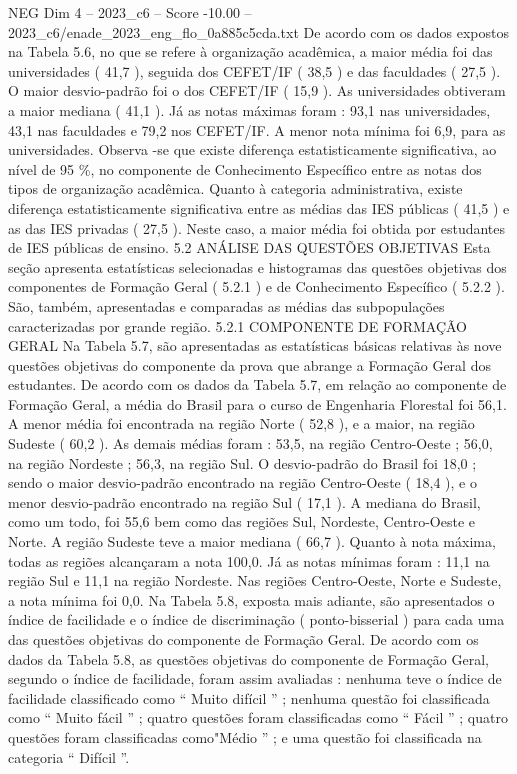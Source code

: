 \begin{textsample}{NEG Dim 4 – 2023\_c6 – Score -10.00 – 2023\_c6/enade\_2023\_eng\_flo\_0a885c5cda.txt}
De acordo com os dados expostos na Tabela 5.6, no que se refere à organização acadêmica, a maior média foi das universidades ( 41,7 ), seguida dos CEFET/IF ( 38,5 ) e das faculdades ( 27,5 ).
O maior desvio-padrão foi o dos CEFET/IF ( 15,9 ).
As universidades obtiveram a maior mediana ( 41,1 ).
Já as notas máximas foram : 93,1 nas universidades, 43,1 nas faculdades e 79,2 nos CEFET/IF.
A menor nota mínima foi 6,9, para as universidades.
Observa -se que existe diferença estatisticamente significativa, ao nível de 95 \%, no componente de Conhecimento Específico entre as notas dos tipos de organização acadêmica.
Quanto à categoria administrativa, existe diferença estatisticamente significativa entre as médias das IES públicas ( 41,5 ) e as das IES privadas ( 27,5 ).
Neste caso, a maior média foi obtida por estudantes de IES públicas de ensino. 5.2 ANÁLISE DAS QUESTÕES OBJETIVAS Esta seção apresenta estatísticas selecionadas e histogramas das questões objetivas dos componentes de Formação Geral ( 5.2.1 ) e de Conhecimento Específico ( 5.2.2 ).
São, também, apresentadas e comparadas as médias das subpopulações caracterizadas por grande região. 5.2.1 COMPONENTE DE FORMAÇÃO GERAL Na Tabela 5.7, são apresentadas as estatísticas básicas relativas às nove questões objetivas do componente da prova que abrange a Formação Geral dos estudantes.
De acordo com os dados da Tabela 5.7, em relação ao componente de Formação Geral, a média do Brasil para o curso de Engenharia Florestal foi 56,1.
A menor média foi encontrada na região Norte ( 52,8 ), e a maior, na região Sudeste ( 60,2 ).
As demais médias foram : 53,5, na região Centro-Oeste ; 56,0, na região Nordeste ; 56,3, na região Sul.
O desvio-padrão do Brasil foi 18,0 ; sendo o maior desvio-padrão encontrado na região Centro-Oeste ( 18,4 ), e o menor desvio-padrão encontrado na região Sul ( 17,1 ).
A mediana do Brasil, como um todo, foi 55,6 bem como das regiões Sul, Nordeste, Centro-Oeste e Norte.
A região Sudeste teve a maior mediana ( 66,7 ).
Quanto à nota máxima, todas as regiões alcançaram a nota 100,0.
Já as notas mínimas foram : 11,1 na região Sul e 11,1 na região Nordeste.
Nas regiões Centro-Oeste, Norte e Sudeste, a nota mínima foi 0,0.
Na Tabela 5.8, exposta mais adiante, são apresentados o índice de facilidade e o índice de discriminação ( ponto-bisserial ) para cada uma das questões objetivas do componente de Formação Geral.
De acordo com os dados da Tabela 5.8, as questões objetivas do componente de Formação Geral, segundo o índice de facilidade, foram assim avaliadas : nenhuma teve o índice de facilidade classificado como “ Muito difícil ” ; nenhuma questão foi classificada como “ Muito fácil ” ; quatro questões foram classificadas como “ Fácil ” ; quatro questões foram classificadas como"Médio ” ; e uma questão foi classificada na categoria “ Difícil ”.

\end{textsample}
